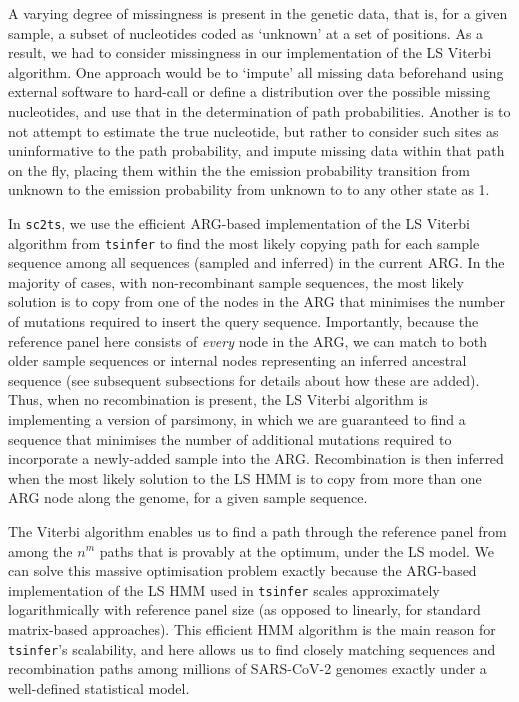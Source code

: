 \documentclass{article}
\begin{document}
A varying degree of missingness is present in the genetic data, that is, for a
given sample, a subset of nucleotides coded as `unknown' at a set of positions.
As a result, we had to consider missingness in our implementation of the LS
Viterbi algorithm. One approach would be to `impute' all missing data
beforehand using external software to hard-call or define a distribution over
the possible missing nucleotides, and use that in the determination of path
probabilities. Another is to not attempt to estimate the true nucleotide, but
rather to consider such sites as uninformative to the path probability, and
impute missing data within that path on the fly, placing them within the
the emission probability transition from unknown to
the emission probability from unknown to
to any other state as 1.

In \texttt{sc2ts}, we use the efficient ARG-based implementation of the
LS Viterbi algorithm from \texttt{tsinfer} \citep{Kelleher2019-ba} to find
the most likely copying path for each sample sequence
among all sequences (sampled and inferred) in the current ARG.
In the majority of cases, with non-recombinant sample sequences,
the most likely solution is to copy from one
of the nodes in the ARG that minimises the number of mutations required
to insert the query sequence. Importantly, because the reference panel here consists of
\emph{every} node in the ARG, we can match to both older sample
sequences or internal nodes representing an inferred ancestral sequence
(see subsequent subsections for details about how these are added).
Thus, when no recombination is present, the LS Viterbi algorithm is
implementing a version of parsimony, in which we are guaranteed to
find a sequence that minimises the number of additional mutations required
to incorporate a newly-added sample into the ARG.
Recombination is then inferred when the most likely solution to the LS
HMM is to copy from more than one ARG node along the genome, for a
given sample sequence.

The Viterbi algorithm enables us to find a path through
the reference panel from among the $n^m$ paths that is provably at the
optimum, under the LS model.
We can solve this massive optimisation problem exactly because the ARG-based
implementation of the LS HMM used in \texttt{tsinfer} scales approximately
logarithmically with reference panel size (as opposed to linearly,
for standard matrix-based approaches).
This efficient HMM algorithm is the main reason for \texttt{tsinfer}'s
scalability, and here allows us to find closely matching
sequences and recombination paths among millions of SARS-CoV-2
genomes exactly under a well-defined statistical model.
\end{document}
